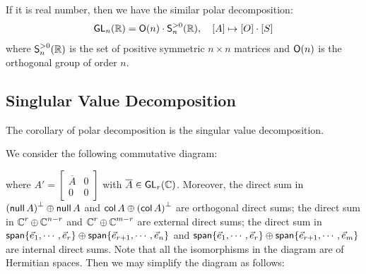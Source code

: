 If it is real number, then we have the similar polar decomposition:
\[
	\GL_n (\R) = \Orth(n) \cdot \mathsf{S}_n^{> 0} (\R), \quad [A] \mapsto [O] \cdot [S]
\]
where $\mathsf{S}_n^{> 0} (\R)$ is the set of positive symmetric $n \times n$ matrices and $\Orth(n)$ is the orthogonal group of order $n$.

\subsection{Singlular Value Decomposition}
The corollary of polar decomposition is the singular value decomposition.

We consider the following commutative diagram:
\begin{center}
\end{center}
where $A' = \begin{bmatrix} \overline{A} & 0 \\ 0 & 0 \end{bmatrix}$ with $\overline{A} \in \GL_r(\C)$. Moreover, the direct sum in ${(\nul{A})}^\perp \oplus \nul{A}$ and $\col{A} \oplus {(\col{A})}^\perp$ are orthogonal direct sums; the direct sum in $\C^r \oplus \C^{n-r}$ and $\C^r \oplus \C^{m-r}$ are external direct sums; the direct sum in $\spn\{ \vec{e}_1, \cdots, \vec{e}_r \} \oplus \spn\{ \vec{e}_{r+1}, \cdots, \vec{e}_n \}$ and $\spn\{ \vec{e}_1, \cdots, \vec{e}_r \} \oplus \spn\{ \vec{e}_{r+1}, \cdots, \vec{e}_m \}$ are internal direct sums. Note that all the isomorphisms in the diagram are of Hermitian spaces. Then we may simplify the diagram as follows:
\begin{center}
\end{center}
